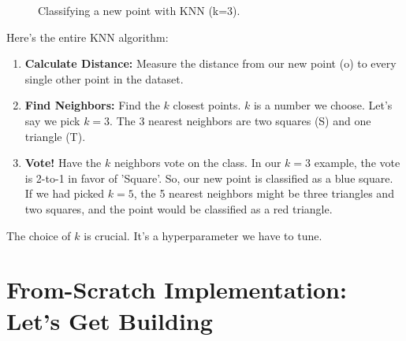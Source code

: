 \documentclass[11pt, letterpaper, openany]{book}
\begin{document}
\begin{figure}[h!]
\centering
{}
\caption{Classifying a new point with KNN (k=3).}
\end{figure}

Here's the entire KNN algorithm:
\begin{enumerate}
    \item \textbf{Calculate Distance:} Measure the distance from our new point (o) to every single other point in the dataset.
    \item \textbf{Find Neighbors:} Find the $k$ closest points. $k$ is a number we choose. Let's say we pick $k=3$. The 3 nearest neighbors are two squares (S) and one triangle (T).
    \item \textbf{Vote!} Have the $k$ neighbors vote on the class. In our $k=3$ example, the vote is 2-to-1 in favor of 'Square'. So, our new point is classified as a blue square. If we had picked $k=5$, the 5 nearest neighbors might be three triangles and two squares, and the point would be classified as a red triangle.
\end{enumerate}
The choice of $k$ is crucial. It's a hyperparameter we have to tune.

\section{From-Scratch Implementation: Let's Get Building}
\end{document}

